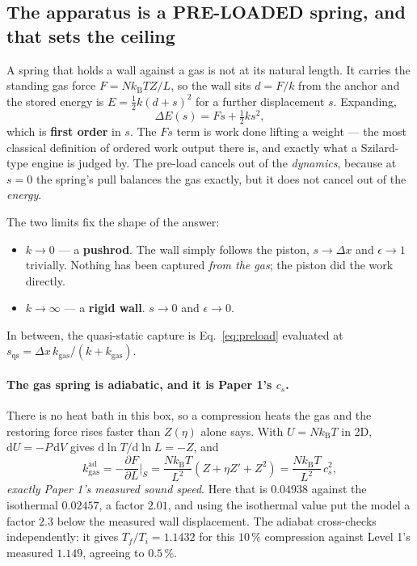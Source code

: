 \documentclass[11pt,a4paper]{article}
\newcommand{\kT}{k_{\mathrm B}T}
\newcommand{\dd}{\mathrm{d}}
\begin{document}
\subsection{The apparatus is a PRE-LOADED spring, and that sets the ceiling}\label{sec:l3ceiling}

A spring that holds a wall against a gas is not at its natural length. It carries the standing gas
force $F = N\kT Z/L$, so the wall sits $d = F/k$ from the anchor and the stored energy is
$E = \tfrac12 k (d+s)^2$ for a further displacement $s$. Expanding,
\begin{equation}
\Delta E(s) = F s + \tfrac12 k s^2 ,
\label{eq:preload}
\end{equation}
which is \textbf{first order} in $s$. The $F s$ term is work done lifting a weight --- the most
classical definition of ordered work output there is, and exactly what a Szilard-type engine is
judged by. The pre-load cancels out of the \emph{dynamics}, because at $s=0$ the spring's pull
balances the gas exactly, but it does not cancel out of the \emph{energy}.

The two limits fix the shape of the answer:
\begin{itemize}\itemsep2pt
\item $k \to 0$ --- a \textbf{pushrod}. The wall simply follows the piston, $s \to \Delta x$ and
  $\epsilon \to 1$ trivially. Nothing has been captured \emph{from the gas}; the piston did the work
  directly.
\item $k \to \infty$ --- a \textbf{rigid wall}. $s \to 0$ and $\epsilon \to 0$.
\end{itemize}
In between, the quasi-static capture is Eq.~\eqref{eq:preload} evaluated at
$s_{\mathrm{qs}} = \Delta x\,k_{\mathrm{gas}}/(k + k_{\mathrm{gas}})$.

\paragraph{The gas spring is adiabatic, and it is Paper 1's $c_s$.} There is no heat bath in this
box, so a compression heats the gas and the restoring force rises faster than $Z(\eta)$ alone says.
With $U = N\kT$ in 2D, $\dd U = -P\,\dd V$ gives $\dd\ln T/\dd\ln L = -Z$, and
\begin{equation}
k_{\mathrm{gas}}^{\mathrm{ad}} = -\frac{\partial F}{\partial L}\bigg|_S
 = \frac{N\kT}{L^2}\left(Z + \eta Z' + Z^2\right) = \frac{N\kT}{L^2}\,c_s^2 ,
\label{eq:kgasad}
\end{equation}
\emph{exactly Paper 1's measured sound speed}. Here that is $0.04938$ against the isothermal
$0.02457$, a factor $2.01$, and using the isothermal value put the model a factor $2.3$ below the
measured wall displacement. The adiabat cross-checks independently: it gives $T_f/T_i = 1.1432$ for
this $10\,\%$ compression against Level 1's measured $1.149$, agreeing to $0.5\,\%$.
\end{document}
